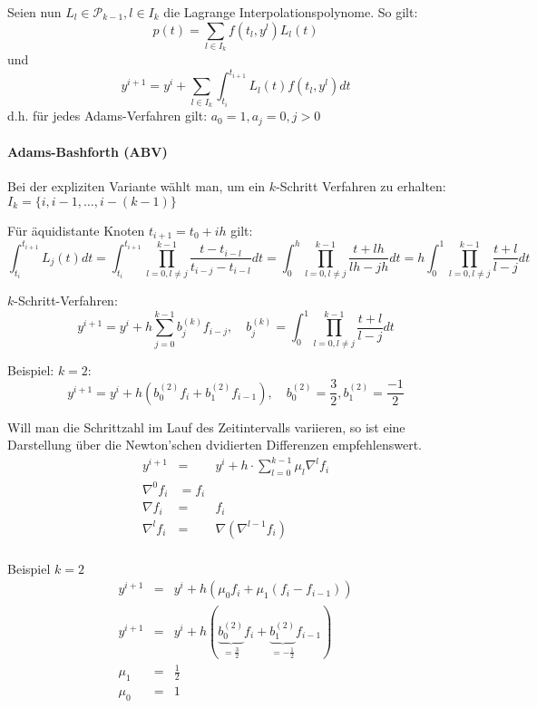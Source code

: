 Seien nun $L_{l}\in \mathcal{P}_{k-1},l\in I_{k}$ die Lagrange Interpolationspolynome. So gilt: $$p(t)=\sum_{l\in I_{k}}f(t_{l},y^{l})L_{l}(t)$$
und $$y^{i+1}=y^{i}+\sum_{l\in I_{k}}\int_{t_{i}}^{t_{i+1}}L_{l}(t)f(t_{l},y^{l})dt$$
d.h. für jedes Adams-Verfahren gilt: $a_{0}=1, a_{j}=0,j>0$

\paragraph{Adams-Bashforth (ABV)}
Bei der expliziten Variante wählt man, um ein $k$-Schritt Verfahren zu erhalten: $I_{k}=\{i,i-1,\ldots,i-(k-1)\}$

Für äquidistante Knoten $t_{i+1}=t_{0}+ih$ gilt:
$$\int_{t_{i}}^{t_{i+1}}L_{j}(t)dt = \int_{t_{i}}^{t_{i+1}}\prod_{l=0,l\not = j}^{k-1}\frac{t-t_{i-l}}{t_{i-j}-t_{i-l}}dt
= \int_{0}^{h}\prod_{l=0,l\not = j}^{k-1}\frac{t+lh}{lh-jh}dt=h\int_{0}^{1}\prod_{l=0,l\not=j}^{k-1}\frac{t+l}{l-j}dt$$

$k$-Schritt-Verfahren:
$$y^{i+1}=y^{i}+h\sum_{j=0}^{k-1}b_{j}^{(k)}f_{i-j},\quad b_{j}^{(k)}=\int_{0}^{1}\prod_{l=0,l\not = j}^{k-1}\frac{t+l}{l-j}dt$$

\begin{example}
Beispiel: $k=2$:
$$y^{i+1}=y^{i}+h(b_{0}^{(2)}f_{i}+b_{1}^{(2)}f_{i-1}),\quad b_{0}^{(2)}=\frac{3}{2},b_{1}^{(2)}=\frac{-1}{2}$$
\end{example}

\begin{remark}
	Will man die Schrittzahl im Lauf des Zeitintervalls variieren, so ist eine Darstellung über die Newton'schen dvidierten Differenzen
	empfehlenswert.
	\begin{eqnarray*}
	y^{i+1}&=&y^{i}+h\cdot \sum_{l=0}^{k-1}\mu_{l}\nabla^{l}f_{i}\\
	\nabla^{0}f_{i}&=f_{i}\\
	\nabla f_{i}&=&f_{i}\\
	\nabla^{l} f_{i}&=&\nabla(\nabla^{l-1}f_{i})\\
	\end{eqnarray*}
\end{remark}

\begin{example}
 Beispiel $k=2$
 \begin{eqnarray*}
 	y^{i+1}&=&y^{i}+h(\mu_{0}f_{i}+\mu_{1}(f_{i}-f_{i-1}))\\
 	y^{i+1}&=&y^{i}+h(\underbrace{b_{0}^{(2)}}_{=\frac{3}{2}}f_{i}+\underbrace{b_{1}^{(2)}}_{=-\frac{1}{2}}f_{i-1})\\
 	\mu_{1}&=&\frac{1}{2}\\
 	\mu_{0}&=&1
 \end{eqnarray*}
\end{example}


